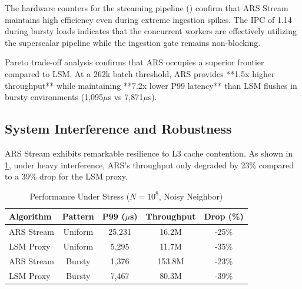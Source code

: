 The hardware counters for the streaming pipeline () confirm that ARS Stream maintains high efficiency even during extreme ingestion spikes. The IPC of 1.14 during bursty loads indicates that the concurrent workers are effectively utilizing the superscalar pipeline while the ingestion gate remains non-blocking.

Pareto trade-off analysis confirms that ARS occupies a superior frontier compared to LSM. At a 262k batch threshold, ARS provides **1.5x higher throughput** while maintaining **7.2x lower P99 latency** than LSM flushes in bursty environments (1,095$\mu$s vs 7,871$\mu$s).

\subsection{System Interference and Robustness}
ARS Stream exhibits remarkable resilience to L3 cache contention. As shown in \cref{tab:interference}, under heavy interference, ARS's throughput only degraded by 23\% compared to a 39\% drop for the LSM proxy.

\begin{table}[h]
\caption{Performance Under Stress ($N=10^8$, Noisy Neighbor)}
\label{tab:interference}
\centering
\begin{tabular}{lcccc}
\toprule
Algorithm & Pattern & P99 ($\mu$s) & Throughput & Drop (\%) \\
\midrule
ARS Stream & Uniform & 25,231 & 16.2M & -25\% \\
LSM Proxy & Uniform & 5,295 & 11.7M & -35\% \\
ARS Stream & Bursty & 1,376 & 153.8M & -23\% \\
LSM Proxy & Bursty & 7,467 & 80.3M & -39\% \\
\bottomrule
\end{tabular}
\end{table}
